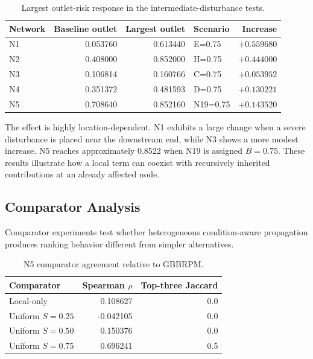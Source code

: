 \begin{table}[H]
\centering
\caption{Largest outlet-risk response in the intermediate-disturbance tests.}
\label{tab:intermediate-disturbance}
\small
\renewcommand{\arraystretch}{1.08}
\begin{tabular*}{\textwidth}{@{\extracolsep{\fill}}lrrlr@{}}
\toprule
Network & Baseline outlet & Largest outlet & Scenario & Increase \\
\midrule
N1 & 0.053760 & 0.613440 & E=0.75 & $+0.559680$ \\
N2 & 0.408000 & 0.852000 & H=0.75 & $+0.444000$ \\
N3 & 0.106814 & 0.160766 & C=0.75 & $+0.053952$ \\
N4 & 0.351372 & 0.481593 & D=0.75 & $+0.130221$ \\
N5 & 0.708640 & 0.852160 & N19=0.75 & $+0.143520$ \\
\bottomrule
\end{tabular*}
\end{table}

The effect is highly location-dependent. N1 exhibits a large change when
a severe disturbance is placed near the downstream end, while N3 shows a
more modest increase. N5 reaches approximately 0.8522 when N19 is assigned
$B=0.75$. These results illustrate how a local term can coexist with
recursively inherited contributions at an already affected node.

\subsection{Comparator Analysis}

Comparator experiments test whether heterogeneous condition-aware
propagation produces ranking behavior different from simpler alternatives.

\begin{table}[H]
\centering
\caption{N5 comparator agreement relative to GBBRPM.}
\label{tab:comparators}
\small
\renewcommand{\arraystretch}{1.08}
\begin{tabular*}{\textwidth}{@{\extracolsep{\fill}}lrr@{}}
\toprule
Comparator & Spearman $\rho$ & Top-three Jaccard \\
\midrule
Local-only & 0.108627 & 0.0 \\
Uniform $S=0.25$ & -0.042105 & 0.0 \\
Uniform $S=0.50$ & 0.150376 & 0.0 \\
Uniform $S=0.75$ & 0.696241 & 0.5 \\
\bottomrule
\end{tabular*}
\end{table}

